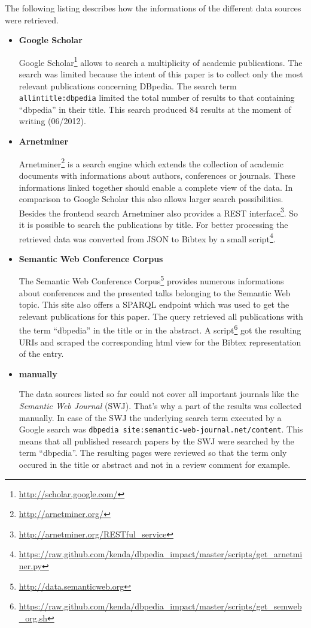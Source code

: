 \documentclass[english]{lni}
\begin{document}
   The following listing describes how the informations of the
   different data sources were retrieved.
\begin{itemize}
\item \textbf{Google Scholar}

     Google Scholar\footnote{\href{http://scholar.google.com/}{http://scholar.google.com/} } allows to search a multiplicity of academic
     publications. The search was limited because the intent of this paper is to
     collect only the most relevant publications concerning DBpedia. The search
     term \texttt{allintitle:dbpedia} limited the total number of results to that
     containing ``dbpedia'' in their title. This search produced 84 results at the
     moment of writing (06/2012).
\item \textbf{Arnetminer}

     Arnetminer\footnote{\href{http://arnetminer.org/}{http://arnetminer.org/} } is a search engine which extends the collection of
     academic documents with informations about authors, conferences or
     journals. These informations linked together should enable a complete view
     of the data. In comparison to Google Scholar this also allows larger search
     possibilities. Besides the frontend search Arnetminer also provides a REST
     interface\footnote{\href{http://arnetminer.org/RESTful_service}{http://arnetminer.org/RESTful\_service} }. So it is possible to search the publications by title. For
     better processing the retrieved data was converted from JSON to Bibtex by a
     small script\footnote{\href{https://raw.github.com/kenda/dbpedia_impact/master/scripts/get_arnetminer.py}{https://raw.github.com/kenda/dbpedia\_impact/master/scripts/get\_arnetminer.py} }.
\item \textbf{Semantic Web Conference Corpus}

     The Semantic Web Conference Corpus\footnote{\href{http://data.semanticweb.org}{http://data.semanticweb.org} } provides numerous informations about
     conferences and the presented talks belonging to the Semantic Web
     topic. This site also offers a SPARQL endpoint which was used to get the
     relevant publications for this paper. The query retrieved all publications
     with the term ``dbpedia'' in the title or in the abstract. A script\footnote{\href{https://raw.github.com/kenda/dbpedia_impact/master/scripts/get_semweb_org.sh}{https://raw.github.com/kenda/dbpedia\_impact/master/scripts/get\_semweb\_org.sh} } got
     the resulting URIs and scraped the corresponding html view for the Bibtex
     representation of the entry.
\item \textbf{manually}

     The data sources listed so far could not cover all important journals like
     the \emph{Semantic Web Journal} (SWJ). That's why a part of the results was
     collected manually. In case of the SWJ the underlying search term executed by a Google
     search was \texttt{dbpedia site:semantic-web-journal.net/content}. This means that all published research papers by the SWJ were
     searched by the term ``dbpedia''. The resulting pages were reviewed so that the
     term only occured in the title or abstract and not in a review comment for example.
\end{itemize}
\end{document}
